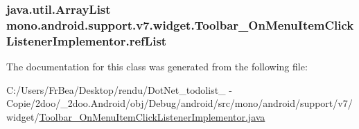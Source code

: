 \hypertarget{classmono_1_1android_1_1support_1_1v7_1_1widget_1_1_toolbar___on_menu_item_click_listener_implementor_2f60f8fbcf6b47b4136cb41c8b5d31bf}{
\subsubsection[{refList}]{\setlength{\rightskip}{0pt plus 5cm}java.util.ArrayList {\bf mono.android.support.v7.widget.Toolbar\_\-OnMenuItemClickListenerImplementor.refList}}}
\label{classmono_1_1android_1_1support_1_1v7_1_1widget_1_1_toolbar___on_menu_item_click_listener_implementor_2f60f8fbcf6b47b4136cb41c8b5d31bf}




The documentation for this class was generated from the following file:\begin{CompactItemize}
\item 
C:/Users/FrBea/Desktop/rendu/DotNet\_\-todolist\_ - Copie/2doo/\_\-2doo.Android/obj/Debug/android/src/mono/android/support/v7/widget/\hyperlink{_toolbar___on_menu_item_click_listener_implementor_8java}{Toolbar\_\-OnMenuItemClickListenerImplementor.java}\end{CompactItemize}
